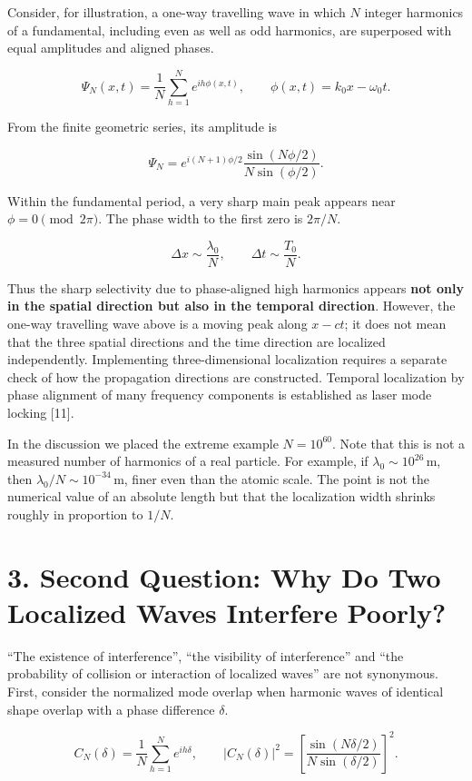 \documentclass[
  a4paper,
]{article}
\begin{document}
Consider, for illustration, a one-way travelling wave in which \(N\)
integer harmonics of a fundamental, including even as well as odd
harmonics, are superposed with equal amplitudes and aligned phases.

\[
\Psi_N(x,t)=\frac1N\sum_{h=1}^{N}e^{ih\phi(x,t)},
\qquad \phi(x,t)=k_0x-\omega_0t.
\]

From the finite geometric series, its amplitude is

\[
\Psi_N=e^{i(N+1)\phi/2}
\frac{\sin(N\phi/2)}{N\sin(\phi/2)}.
\]

Within the fundamental period, a very sharp main peak appears near
\(\phi=0\pmod{2\pi}\). The phase width to the first zero is \(2\pi/N\).

\[
\Delta x\sim\frac{\lambda_0}{N},
\qquad
\Delta t\sim\frac{T_0}{N}.
\]

Thus the sharp selectivity due to phase-aligned high harmonics appears
\textbf{not only in the spatial direction but also in the temporal
direction}. However, the one-way travelling wave above is a moving peak
along \(x-ct\); it does not mean that the three spatial directions and
the time direction are localized independently. Implementing
three-dimensional localization requires a separate check of how the
propagation directions are constructed. Temporal localization by phase
alignment of many frequency components is established as laser mode
locking {[}11{]}.

In the discussion we placed the extreme example \(N=10^{60}\). Note that
this is not a measured number of harmonics of a real particle. For
example, if \(\lambda_0\sim10^{26}\,\mathrm m\), then
\(\lambda_0/N\sim10^{-34}\,\mathrm m\), finer even than the atomic
scale. The point is not the numerical value of an absolute length but
that the localization width shrinks roughly in proportion to \(1/N\).

\section{3. Second Question: Why Do Two Localized Waves Interfere
Poorly?}\label{second-question-why-do-two-localized-waves-interfere-poorly}

``The existence of interference'', ``the visibility of interference''
and ``the probability of collision or interaction of localized waves''
are not synonymous. First, consider the normalized mode overlap when
harmonic waves of identical shape overlap with a phase difference
\(\delta\).

\[
C_N(\delta)=\frac1N\sum_{h=1}^N e^{ih\delta},
\qquad
|C_N(\delta)|^2=
\left[\frac{\sin(N\delta/2)}{N\sin(\delta/2)}\right]^2.
\]
\end{document}
